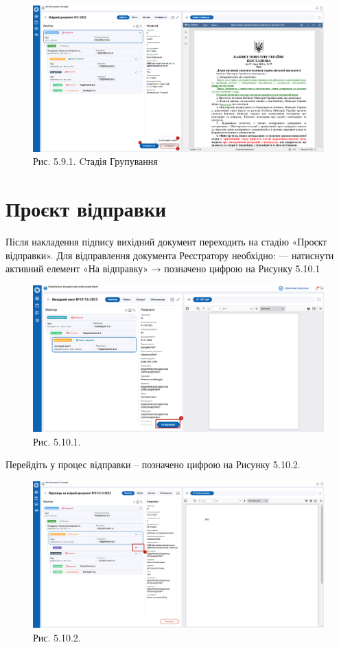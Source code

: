 \begin{figure}[!htbp]
\centerline{\includegraphics[width=\textwidth]{img/5.9.1.png}}
\caption{Рис. 5.9.1. Cтадія Групування}
\end{figure}

\section{Проєкт відправки}

Після накладення підпису вихідний документ переходить на стадію «Проєкт відправки».
Для відправлення документа Реєстратору необхідно:
--- натиснути активний елемент «На відправку» → позначено цифрою  на Рисунку 5.10.1

\begin{figure}[!htbp]
\centerline{\includegraphics[width=\textwidth]{img/5.10.1.png}}
\caption{Рис. 5.10.1. }
\end{figure}

Перейдіть у процес відправки – позначено цифрою  на Рисунку 5.10.2.

\begin{figure}[!htbp]
\centerline{\includegraphics[width=\textwidth]{img/5.10.2.png}}
\caption{Рис. 5.10.2. }
\end{figure}

